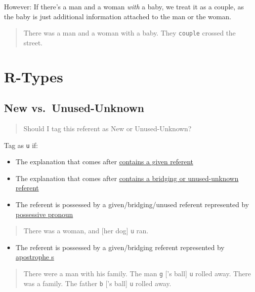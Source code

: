 \documentclass[
]{book}
\providecommand{\tightlist}{%
  \setlength{\itemsep}{0pt}\setlength{\parskip}{0pt}}
\begin{document}
However: If there's a man and a woman \emph{with} a baby,
we treat it as a couple,
as the baby is just additional information
attached to the man or the woman.

\begin{quote}
There was a man and a woman with a baby.
They \texttt{couple} crossed the street.
\end{quote}

\hypertarget{r-types}{%
\section{R-Types}\label{r-types}}

\hypertarget{new-vs.-unused-unknown}{%
\subsection{New vs.~Unused-Unknown}\label{new-vs.-unused-unknown}}

\begin{quote}
Should I tag this referent as New or Unused-Unknown?
\end{quote}

Tag as \texttt{u} if:

\begin{itemize}
\item
  The explanation that comes after \protect\hyperlink{explanation-given-referent}{contains a given referent}
\item
  The explanation that comes after \protect\hyperlink{explanation-bridging-or-unused-unknown-referent}{contains a bridging or unused-unknown referent}
\item
  The referent is possessed by a given/bridging/unused referent represented by \protect\hyperlink{possessive-pronouns}{possessive pronoun}
\end{itemize}

\begin{quote}
There was a woman, and {[}her dog{]} \texttt{u} ran.
\end{quote}

\begin{itemize}
\tightlist
\item
  The referent is possessed by a given/bridging referent represented by \protect\hyperlink{apostrophe-s}{apostrophe s}
\end{itemize}

\begin{quote}
There were a man with his family. The man \texttt{g} {[}'s ball{]} \texttt{u} rolled away.
There was a family. The father \texttt{b} {[}'s ball{]} \texttt{u} rolled away.
\end{quote}
\end{document}
